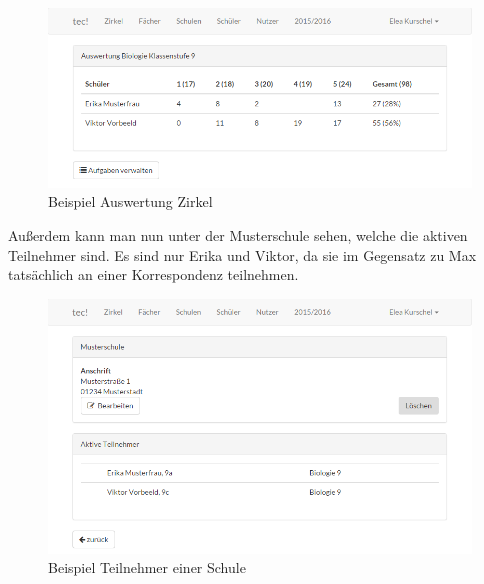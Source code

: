 \begin{figure}[h]
	\centering
	\includegraphics[scale=.50]{bilder/Protokoll_Auswertung.png}
	\caption{Beispiel Auswertung Zirkel}
\end{figure}

Außerdem kann man nun unter der Musterschule sehen, welche die aktiven Teilnehmer sind. Es sind nur Erika und Viktor, da sie im Gegensatz zu Max tatsächlich an einer Korrespondenz teilnehmen.

\begin{figure}[h]
	\centering
	\includegraphics[scale=.50]{bilder/Protokoll_Schule.png}
	\caption{Beispiel Teilnehmer einer Schule}
\end{figure}
